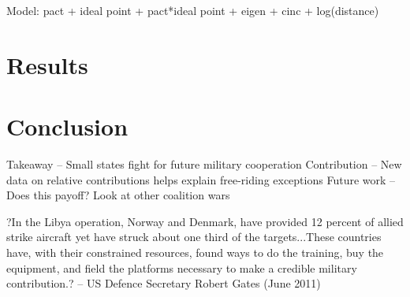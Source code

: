 \documentclass[12pt,letterpaper]{article}
\begin{document}
Model: pact + ideal point + pact*ideal point + eigen + cinc + log(distance)


\section{Results}


\section{Conclusion}
Takeaway -- Small states fight for future military cooperation
Contribution -- New data on relative contributions helps explain free-riding exceptions
Future work -- Does this payoff? Look at other coalition wars

?In the Libya operation, Norway and Denmark, have provided 12 percent of allied strike aircraft yet have struck about one third of the targets...These countries have, with their constrained resources, found ways to do the training, buy the equipment, and field the platforms necessary to make a credible military contribution.? -- US Defence Secretary Robert Gates (June 2011)




\end{document}
